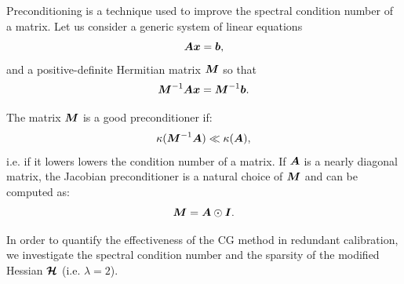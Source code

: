 \documentclass[useAMS,usenatbib]{mn2e}
\newcommand{\bA}{\bmath{A}}
\newcommand{\bM}{\bmath{M}}
\newcommand{\bI}{\bmath{I}}
\newcommand{\bb}{\bmath{b}}
\newcommand{\bx}{\bmath{x}}
\newcommand{\bmH}{\bmath{\mathcal{H}}}
\begin{document}
Preconditioning is a technique used to improve the spectral condition number of a matrix. Let us consider a generic system of linear equations 
\begin{equation}
\label{eq:prec}
\bA\bx = \bb,
\end{equation}
and a positive-definite Hermitian matrix $\bM$ so that 
\begin{equation}
\label{eq:prec}
\bM^{-1}\bA\bx = \bM^{-1}\bb.
\end{equation}

The matrix $\bM$ is a good preconditioner if:
\begin{equation}
\label{eq:kappa}
\kappa(\bM^{-1}\bA) \ll \kappa(\bA),
\end{equation}
i.e. if it lowers lowers the condition number of a matrix.
If $\bA$ is a nearly diagonal matrix, the Jacobian preconditioner is a natural choice of $\bM$ and can be computed as:
\begin{equation}
\bM = \bA\odot\bI. 
\end{equation}


In order to quantify the effectiveness of the CG method in redundant calibration, we investigate the spectral condition number and the sparsity of the modified Hessian $\bmH$ (i.e. $\lambda = 2$).
\end{document}
